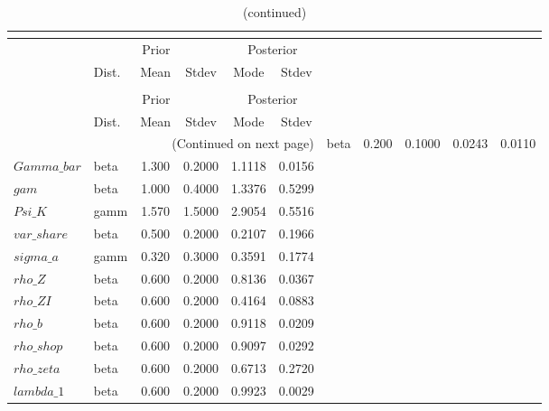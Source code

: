  
\begin{center}
\begin{longtable}{llcccc} 
\caption{Results from posterior maximization (parameters)}\\
 \label{Table:Posterior:1}\\
\toprule 
  & \multicolumn{3}{c}{Prior}  &  \multicolumn{2}{c}{Posterior} \\
  \cmidrule(r{.75em}){2-4} \cmidrule(r{.75em}){5-6}
  & Dist. & Mean  & Stdev & Mode & Stdev \\ 
\midrule \endfirsthead 
\caption{(continued)}\\
 \bottomrule 
  & \multicolumn{3}{c}{Prior}  &  \multicolumn{2}{c}{Posterior} \\
  \cmidrule(r{.75em}){2-4} \cmidrule(r{.75em}){5-6}
  & Dist. & Mean  & Stdev & Mode & Stdev \\ 
\midrule \endhead 
\bottomrule \multicolumn{6}{r}{(Continued on next page)}\endfoot 
\bottomrule\endlastfoot 
$Psi$ & beta &   0.200 & 0.1000 &   0.0243 &  0.0110 \\ 
$Gamma\_bar$ & beta &   1.300 & 0.2000 &   1.1118 &  0.0156 \\ 
$gam$ & beta &   1.000 & 0.4000 &   1.3376 &  0.5299 \\ 
$Psi\_K$ & gamm &   1.570 & 1.5000 &   2.9054 &  0.5516 \\ 
$var\_share$ & beta &   0.500 & 0.2000 &   0.2107 &  0.1966 \\ 
$sigma\_a$ & gamm &   0.320 & 0.3000 &   0.3591 &  0.1774 \\ 
$rho\_Z$ & beta &   0.600 & 0.2000 &   0.8136 &  0.0367 \\ 
$rho\_ZI$ & beta &   0.600 & 0.2000 &   0.4164 &  0.0883 \\ 
$rho\_b$ & beta &   0.600 & 0.2000 &   0.9118 &  0.0209 \\ 
$rho\_shop$ & beta &   0.600 & 0.2000 &   0.9097 &  0.0292 \\ 
$rho\_zeta$ & beta &   0.600 & 0.2000 &   0.6713 &  0.2720 \\ 
$lambda\_1$ & beta &   0.600 & 0.2000 &   0.9923 &  0.0029 \\ 
\end{longtable}
 \end{center}
